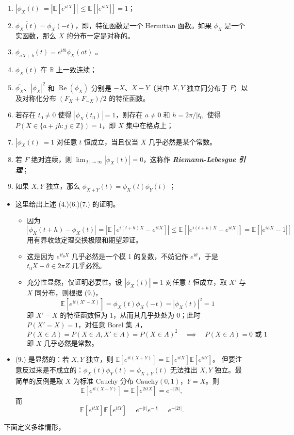 \begin{enumerate}
\def\labelenumi{\arabic{enumi}.}
\item
  $|\phi_X(t)| = |\mathbb{E}[e^{itX}]| \le \mathbb{E}[|e^{itX}|] = 1$；
\item
  $\overline{\phi_X(t)} = \phi_X(-t)$，即，特征函数是一个 Hermitian 函数。如果 $\phi_X$ 是一个实函数，那么 $X$ 的分布一定是对称的。
\item
  $\phi_{aX+b}(t)=e^{itb}\phi_X(at)$ 。
\item
  $\phi_X(t)$ 在 $\mathbb{R}$ 上一致连续；
\item
  $\overline{\phi_X}$、$|\phi_X|^2$ 和 $\operatorname{Re}(\phi_X)$ 分别是 $-X$、$X-Y$（其中 $X,Y$ 独立同分布于 $F$）以及对称化分布 $(F_X + F_{-X})/2$ 的特征函数。
\item
  若存在 $t_0 \neq 0$ 使得 $|\phi_X(t_0)| = 1$，则存在 $a \neq 0$ 和 $h=2\pi/|t_0|$ 使得 $P(X \in \{a + jh: j \in \mathbb{Z}\}) = 1$，即 $X$ 集中在格点上；
\item 
  $|\phi_X(t)|=1$ 对任意 $t$ 恒成立，当且仅当 $X$ 几乎必然是某个常数。
\item
  若 $F$ 绝对连续，则 $\lim_{|t|\to\infty} |\phi_X(t)| = 0$，这称作 \textbf{\emph{Riemann-Lebesgue 引理}}；
\item
  如果 $X,Y$ 独立，那么 $\phi_{X+Y}(t)=\phi_X(t)\phi_Y(t)$ ；
\end{enumerate}

\begin{remark}
  \begin{itemize}\tightlist
    \item 这里给出上述 (4.)(6.)(7.) 的证明。
    \begin{itemize}\tightlist
      \item[(4.)] 因为 
      \[      |\phi_X(t+h)-\phi_X(t)|=|\mathbb E[e^{i(t+h)X}-e^{itX}]|\le\mathbb E[|e^{i(t+h)X}-e^{itX}|]=\mathbb E[|e^{ihX}-1|]
      \]      用有界收敛定理交换极限和期望即证。
      \item[(6.)] 这是因为 $e^{it_0 X}$ 几乎必然是一个模 1 的复数，不妨记作 $e^{i\theta}$，于是 $t_0X-\theta\in 2\pi Z$ 几乎必然。
      \item[(7.)] 充分性显然，仅证明必要性。设 $|\phi_X(t)|=1$ 对任意 $t$ 恒成立，取 $X'$ 与 $X$ 同分布，则根据 (9.)， 
      \[      \mathbb E[e^{it (X'-X)}]=\phi_X(t)\phi_X(-t)=|\phi_X(t)|^2=1
      \]      即 $X'-X$ 的特征函数恒为 1，从而其几乎处处为 0；此时 $P(X'=X)=1$，对任意 Borel 集 $A$，
      \[      P(X\in A)=P(X\in A,X'\in A)=P(X\in A)^2\quad \implies \quad P(X\in A)=0\text{ 或 }1
      \]      即 $X$ 几乎必然是常数。
    \end{itemize}
    \item (9.) 是显然的：若 $X,Y$ 独立，则 $\mathbb E[e^{it(X+Y)}]=\mathbb E[e^{itX}]\mathbb E[e^{itY}]$。
    但要注意反过来是不成立的：$\phi_X(t)\phi_Y(t)=\phi_{X+Y}(t)$ 无法推出 $X,Y$ 独立。最简单的反例是取 $X$ 为标准 Cauchy 分布 $\mathrm{Cauchy}(0,1)$，$Y=X$。则
    \[
    \mathbb E[e^{it(X+Y)}]=\mathbb E[e^{2itX}]=e^{-|2t|},
    \]
    而
    \[
    \mathbb E[e^{itX}]\mathbb E[e^{itY}]
    =e^{-|t|}e^{-|t|}=e^{-|2t|}.
    \]
  \end{itemize}
\end{remark}
下面定义多维情形，

